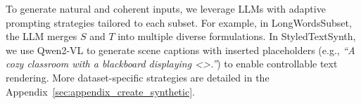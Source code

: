 



To generate natural and coherent inputs, we leverage LLMs with adaptive prompting strategies tailored to each subset. For example, in LongWordsSubset, the LLM merges $S$ and $T$ into multiple diverse formulations. In StyledTextSynth, we use Qwen2-VL to generate scene captions with inserted placeholders (e.g., \textit{“A cozy classroom with a blackboard displaying \textless{}\textgreater.”}) to enable controllable text rendering. More dataset-specific strategies are detailed in the Appendix~\ref{sec:appendix_create_synthetic}.